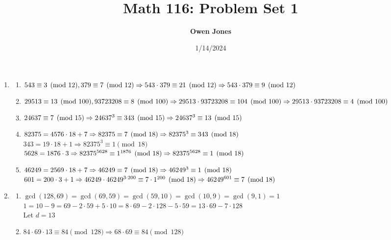 \documentclass[10pt]{article}
\title{\bf Math 116: Problem Set 1}
\date{1/14/2024}
\author{\bf Owen Jones}
\begin{document}
\maketitle
\begin{enumerate}[label=\arabic*.]
    \item \begin{enumerate}
        \item $543\equiv 3\pmod{12},379\equiv 7\pmod{12}\Rightarrow 543\cdot 379\equiv 21\pmod{12}\\\Rightarrow 543\cdot 379\equiv 9\pmod{12}$
        \item $29513\equiv 13\pmod{100}, 93723208\equiv 8\pmod{100}\\\Rightarrow 29513\cdot 93723208\equiv 104\pmod{100}\\\Rightarrow 29513\cdot 93723208\equiv 4\pmod{100}$
        \item $24637\equiv 7\pmod{15}\Rightarrow {24637}^3\equiv 343\pmod{15}\\\Rightarrow {24637}^3\equiv 13\pmod{15}$
        \item $82375=4576\cdot 18+7\Rightarrow 82375\equiv 7\pmod{18}\\\Rightarrow {82375}^3\equiv 343\pmod{18}$\\ $343=19\cdot 18+1\Rightarrow {82375}^3\equiv 1\pmod{18}$\\ $5628=1876\cdot 3\Rightarrow {82375}^{5628}\equiv 1^{1876}\pmod{18}\\\Rightarrow {82375}^{5628}\equiv 1\pmod{18}$
        \item $46249=2569\cdot 18+7\Rightarrow 46249\equiv 7\pmod{18}\\\Rightarrow {46249}^3\equiv 1\pmod{18}$\\ $601=200\cdot 3+1\Rightarrow {46249}\cdot{46249}^{3\cdot200}\equiv 7\cdot 1^{200}\pmod{18}\\\Rightarrow {46249}^{601}\equiv 7\pmod{18}$
    \end{enumerate}
    \item \begin{enumerate}
        \item $\gcd(128,69)=\gcd(69,59)=\gcd(59,10)=\gcd(10,9)=\gcd(9,1)=1$\\ 
        $1=10-9=69-2\cdot59+5\cdot10=8\cdot69-2\cdot128-5\cdot59=13\cdot69-7\cdot128$\\
        Let $d=13$
        \item $84\cdot69\cdot13\equiv 84\pmod{128}\Rightarrow 68\cdot 69\equiv 84\pmod{128}$\\

\end{enumerate}
\end{enumerate}
\end{document}

